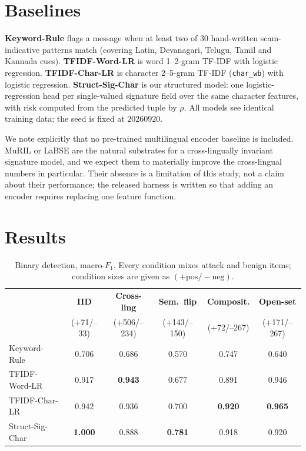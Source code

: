 \documentclass[11pt,a4paper]{article}
\begin{document}
\section{Baselines}
\label{sec:baselines}

\textbf{Keyword-Rule} flags a message when at least two of 30 hand-written
scam-indicative patterns match (covering Latin, Devanagari, Telugu, Tamil and
Kannada cues). \textbf{TFIDF-Word-LR} is word 1--2-gram TF-IDF with logistic
regression. \textbf{TFIDF-Char-LR} is character 2--5-gram TF-IDF
(\texttt{char\_wb}) with logistic regression. \textbf{Struct-Sig-Char} is our
structured model: one logistic-regression head per single-valued signature field
over the same character features, with risk computed from the predicted tuple by
$\rho$. All models see identical training data; the seed is fixed at
$20260920$.

We note explicitly that no pre-trained multilingual encoder baseline is included.
MuRIL \cite{khanuja2021muril} or LaBSE \cite{feng2022labse} are the natural
substrates for a cross-lingually invariant signature model, and we expect them
to materially improve the cross-lingual numbers in particular. Their absence is
a limitation of this study, not a claim about their performance; the released
harness is written so that adding an encoder requires replacing one feature
function.

\section{Results}
\label{sec:results}

\begin{table}[t]
\centering\small
\caption{Binary detection, macro-$F_1$. Every condition mixes attack and benign
items; condition sizes are given as $(+\text{pos}/-\text{neg})$.}
\label{tab:main}
\begin{tabular}{@{}lccccc@{}}
\toprule
& \textbf{IID} & \textbf{Cross-ling} & \textbf{Sem.\ flip} &
  \textbf{Composit.} & \textbf{Open-set} \\
& \scriptsize(+71/--33) & \scriptsize(+506/--234) & \scriptsize(+143/--150)
& \scriptsize(+72/--267) & \scriptsize(+171/--267) \\
\midrule
Keyword-Rule     & 0.706 & 0.686 & 0.570 & 0.747 & 0.640 \\
TFIDF-Word-LR    & 0.917 & \textbf{0.943} & 0.677 & 0.891 & 0.946 \\
TFIDF-Char-LR    & 0.942 & 0.936 & 0.700 & \textbf{0.920} & \textbf{0.965} \\
Struct-Sig-Char  & \textbf{1.000} & 0.888 & \textbf{0.781} & 0.918 & 0.920 \\
\bottomrule
\end{tabular}
\end{table}
\end{document}
